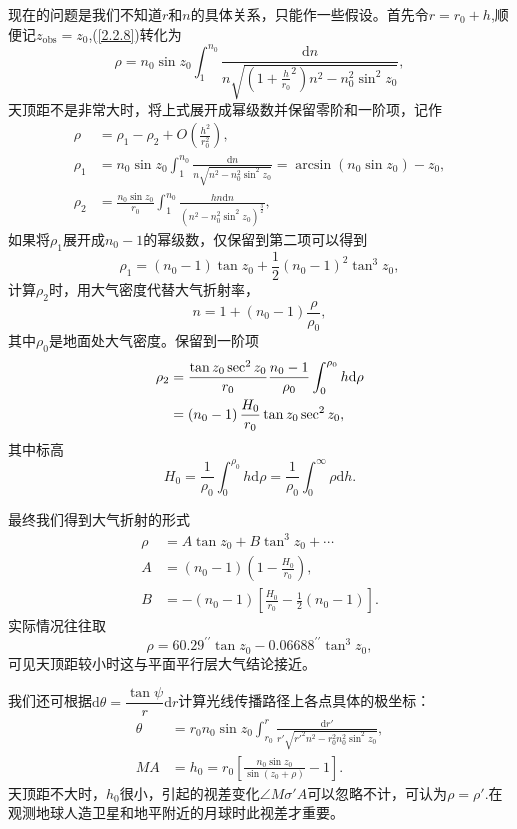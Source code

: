 \documentclass[11pt, a4paper, oneside]{ctexart}
\numberwithin{equation}{subsection}
\begin{document}
现在的问题是我们不知道$r$和$n$的具体关系，只能作一些假设。首先令$r=r_0+h$,顺便记$z_{\text{obs}}=z_{0}$,(\ref{2.2.8})转化为
\begin{equation}
\rho=n_0\sin z_0\int_1^{n_0}\frac{\mathrm{d}n}{n\sqrt{\left(1+\frac{h}{r_0}^2\right)n^2-n_0^2\sin^{2}z_0}},
\end{equation}
天顶距不是非常大时，将上式展开成幂级数并保留零阶和一阶项，记作
\begin{align}
\rho&=\rho_1-\rho_2+O\left(\frac{h^2}{r_0^2}\right),\\
\rho_1&=n_0\sin z_0\int_1^{n_0}\frac{\mathrm{d}n}{n\sqrt{n^2-n_0^2\sin^2z_0}}=\arcsin\left(n_0\sin z_0\right)-z_0,\\
\rho_2&=\frac{n_0\sin z_0}{r_0}\int_1^{n_0}\frac{hn\mathrm{d}n}{\left(n^2-n_0^2\sin^2z_0\right)^\frac32},
\end{align}
如果将$\rho_1$展开成$n_0-1$的幂级数，仅保留到第二项可以得到
\begin{equation}
\rho_1=\left(n_0-1\right)\tan z_0+\frac{1}{2}\left(n_0-1\right)^2\tan^3z_0,
\end{equation}
计算$\rho_2$时，用大气密度代替大气折射率，
\begin{equation}
n=1+\left(n_0-1\right)\frac{\rho}{\rho_0},
\end{equation}
其中$\rho_0$是地面处大气密度。保留到一阶项
\begin{align}
\rho_2&=\frac{\tan z_0\sec^2 z_0}{r_0}\frac{n_0-1}{\rho_0}\int_0^{\rho_0}h\mathrm{d}\rho\notag\\
&=\left(n_0-1\right)\frac{H_0}{r_0}\tan z_0\sec^2z_0,
\end{align}
其中标高
\begin{equation}
H_0=\frac{1}{\rho_0}\int_0^{\rho_0}h\mathrm{d}\rho=\frac{1}{\rho_0}\int_0^\infty\rho\mathrm{d}h.
\end{equation}

最终我们得到大气折射的形式
\begin{align}
\rho&=A\tan z_0+B\tan^3z_0+\cdots\\
A&=\left(n_0-1\right)\left(1-\frac{H_0}{r_0}\right),\\
B&=-\left(n_0-1\right)\left[\frac{H_0}{r_0}-\frac{1}{2}\left(n_0-1\right)\right].
\end{align}
实际情况往往取
\begin{equation}
\rho=60.29^{\prime\prime}\tan z_0-0.06688^{\prime\prime}\tan^3z_0,
\end{equation}
可见天顶距较小时这与平面平行层大气结论接近。

我们还可根据$\mathrm{d}\theta=\dfrac{\tan\psi}{r}\mathrm{d}r$计算光线传播路径上各点具体的极坐标：
\begin{align}
\theta&=r_0n_0\sin z_0\int_{r_0}^r\frac{\mathrm{d}r'}{r'\sqrt{r'^{2}n^2-r^2_0n_0^2\sin^2z_0}},\\
MA&=h_0=r_0\left[\frac{n_0\sin z_0}{\sin\left(z_0+\rho\right)}-1\right].
\end{align}
天顶距不大时，$h_{0}$很小，引起的视差变化$\angle{M\sigma'A}$可以忽略不计，可认为$\rho=\rho'$.在观测地球人造卫星和地平附近的月球时此视差才重要。
\end{document}
